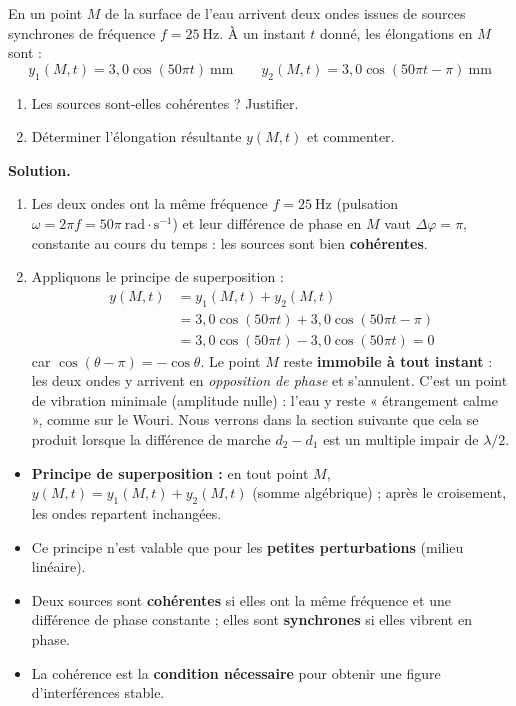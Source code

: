 \documentclass[11pt]{article}
\begin{document}
\begin{exoresolu}
En un point $M$ de la surface de l'eau arrivent deux ondes issues de sources synchrones de fréquence $f = 25\ \mathrm{Hz}$. À un instant $t$ donné, les élongations en $M$ sont :
\[
y_1(M,t) = 3{,}0\cos\!\left(50\pi t\right)\ \mathrm{mm}
\qquad
y_2(M,t) = 3{,}0\cos\!\left(50\pi t - \pi\right)\ \mathrm{mm}
\]
\begin{enumerate}
\item Les sources sont-elles cohérentes ? Justifier.
\item Déterminer l'élongation résultante $y(M,t)$ et commenter.
\end{enumerate}
\tcblower
\textbf{Solution.}
\begin{enumerate}
\item Les deux ondes ont la même fréquence $f = 25\ \mathrm{Hz}$ (pulsation $\omega = 2\pi f = 50\pi\ \mathrm{rad\cdot s^{-1}}$) et leur différence de phase en $M$ vaut $\Delta\varphi = \pi$, constante au cours du temps : les sources sont bien \textbf{cohérentes}.
\item Appliquons le principe de superposition :
\begin{align*}
y(M,t) &= y_1(M,t) + y_2(M,t)\\
&= 3{,}0\cos(50\pi t) + 3{,}0\cos(50\pi t - \pi)\\
&= 3{,}0\cos(50\pi t) - 3{,}0\cos(50\pi t) = 0
\end{align*}
car $\cos(\theta - \pi) = -\cos\theta$. Le point $M$ reste \textbf{immobile à tout instant} : les deux ondes y arrivent en \emph{opposition de phase} et s'annulent. C'est un point de vibration minimale (amplitude nulle) : l'eau y reste « étrangement calme », comme sur le Wouri. Nous verrons dans la section suivante que cela se produit lorsque la différence de marche $d_2 - d_1$ est un multiple impair de $\lambda/2$.
\end{enumerate}
\end{exoresolu}

\begin{aretenir}
\begin{itemize}
\item \textbf{Principe de superposition :} en tout point $M$, $y(M,t) = y_1(M,t) + y_2(M,t)$ (somme algébrique) ; après le croisement, les ondes repartent inchangées.
\item Ce principe n'est valable que pour les \textbf{petites perturbations} (milieu linéaire).
\item Deux sources sont \textbf{cohérentes} si elles ont la même fréquence et une différence de phase constante ; elles sont \textbf{synchrones} si elles vibrent en phase.
\item La cohérence est la \textbf{condition nécessaire} pour obtenir une figure d'interférences stable.
\end{itemize}
\end{aretenir}
\end{document}
